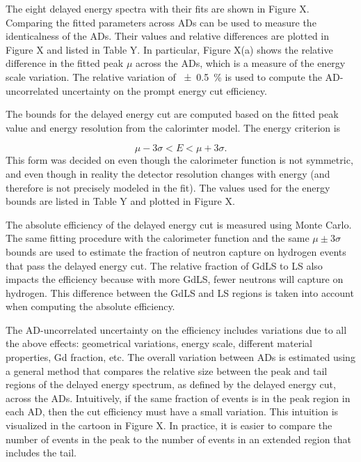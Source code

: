 The eight delayed energy spectra with their fits are shown in Figure X. %
Comparing the fitted parameters across ADs can be used
to measure the identicalness of the ADs.
Their values and relative differences are plotted in Figure X %
and listed in Table Y. %
In particular, Figure X(a) shows the relative difference %
in the fitted peak $\mu$ across the ADs,
which is a measure of the energy scale variation.
The relative variation of \SI{+-0.5}{\percent}
is used to compute the AD-uncorrelated uncertainty
on the prompt energy cut efficiency.

The bounds for the delayed energy cut are computed
based on the fitted peak value and energy resolution
from the calorimter model. The energy criterion is

\begin{equation}
    \mu - 3\sigma < E < \mu + 3\sigma.
\end{equation}
This form was decided on even though the calorimeter function
is not symmetric, and even though in reality
the detector resolution changes with energy
(and therefore is not precisely modeled in the fit).
The values used for the energy bounds are listed in Table Y %
and plotted in Figure X. %

The absolute efficiency of the delayed energy cut
is measured using Monte Carlo.
The same fitting procedure with the calorimeter function
and the same $\mu \pm 3\sigma$ bounds are used to
estimate the fraction of neutron capture on hydrogen events
that pass the delayed energy cut.
The relative fraction of GdLS to LS also impacts the efficiency
because with more GdLS, fewer neutrons will capture on hydrogen.
This difference between the GdLS and LS regions is taken into account
when computing the absolute efficiency.

The AD-uncorrelated uncertainty on the efficiency
includes variations due to all the above effects:
geometrical variations, energy scale, different material properties,
Gd fraction, etc.
The overall variation between ADs is estimated using a general method
that compares the relative size between the peak and tail regions
of the delayed energy spectrum, as defined by the delayed energy cut,
across the ADs.
Intuitively, if the same fraction of events is in the peak region in each AD,
then the cut efficiency must have a small variation.
This intuition is visualized in the cartoon in Figure X. %
In practice, it is easier to compare the number of events in the peak
to the number of events in an extended region that includes the tail.

